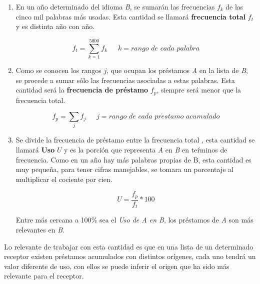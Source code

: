 \newpage

\begin{enumerate}
	
	\item En un año determinado del idioma \textit{B}, se sumarán las frecuencias $f_{k}$ de las cinco mil palabras más usadas.  Esta cantidad se llamará \textbf{frecuencia total} $f_{t}$ y es distinta año con año. 
	
	\begin{equation}
	\label{ec.ftot}
	f_{t} = \sum_{k=1}^{5000} f_{k} \,\,\,\,\,\,\,\,\, k = rango\,\, de \,\,cada \,\,palabra
	\end{equation}
	
	\item Como se conocen los rangos $j$,  que ocupan los préstamos \textit{A} en la lista de \textit{B}, se procede a sumar sólo las frecuencias asociadas a estas palabras. Esta cantidad será la \textbf{frecuencia de préstamo} $f_{p}$,  siempre será menor que la frecuencia total.
	
	\begin{equation}
	\label{ec.fpres}
	f_{p} = \sum_{j} f_{j} \,\,\,\,\,\,\,\,\, j = rango\,\, de \,\,cada \,\,pr\acute{e}stamo\,\,acumulado
	\end{equation}
	
	
	\item  Se divide la frecuencia de préstamo entre la frecuencia total , esta cantidad se llamará  \textbf{Uso} $U$ y es la porción que representa \textit{A} en \textit{B} en teŕminos de frecuencia.  Como en un año hay más palabras propias de B, esta cantidad es muy pequeña, para tener cifras manejables, se tomara un porcentaje al multiplicar el cociente por cien.  

	\begin{equation}
	\label{ec.fuso}
	 U = \frac{f_{p}}{f_{t}} * 100
	\end{equation}
	
	
	Entre más cercana a 100$\%$ sea el \textit{Uso de A en B}, los préstamos de \textit{A} son más relevantes en \textit{B}.

\end{enumerate}

Lo relevante de trabajar con esta cantidad es que en una lista de un determinado receptor existen préstamos acumulados con distintos orígenes, cada uno tendrá un valor diferente de uso, con ellos se puede inferir el origen que ha sido más relevante para el receptor. 


\newpage

